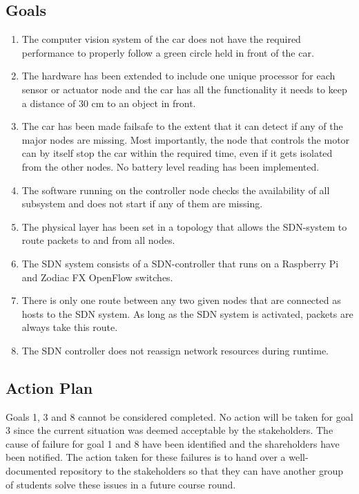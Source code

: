 \documentclass[11pt, titlepage]{article} %
\begin{document}
\subsection{Goals}
\begin{enumerate}
\item The computer vision system of the car does not have the required performance to
properly follow a green circle held in front of the car.

\item The hardware has been extended to include one unique processor for each sensor or actuator
node and the car has all the functionality it needs to keep a distance of 30 cm to an
object in front.

\item The car has been made failsafe to the extent that it can detect if any of the major
nodes are missing. Most importantly, the node that controls the motor can by itself
stop the car within the required time, even if it gets isolated from the other nodes.
No battery level reading has been implemented.

\item The software running on the controller node checks the availability of all subsystem
and does not start if any of them are missing.

\item The physical layer has been set in a topology that allows the SDN-system
to route packets to and from all nodes.

\item The SDN system consists of a SDN-controller that runs on a Raspberry Pi and Zodiac FX OpenFlow
switches.

\item There is only one route between any two given nodes that are connected as hosts to the
SDN system. As long as the SDN system is activated, packets are always take this route.

\item The SDN controller does not reassign network resources during runtime.
\end{enumerate}

\subsection{Action Plan}
Goals 1, 3 and 8 cannot be considered completed. No action will be taken for goal 3 since
the current situation was deemed acceptable by the stakeholders. The cause of failure for
goal 1 and 8 have been identified and the shareholders have been notified. The action taken
for these failures is to hand over a well-documented repository to the stakeholders so that
they can have another group of students solve these issues in a future course round.
\end{document}
